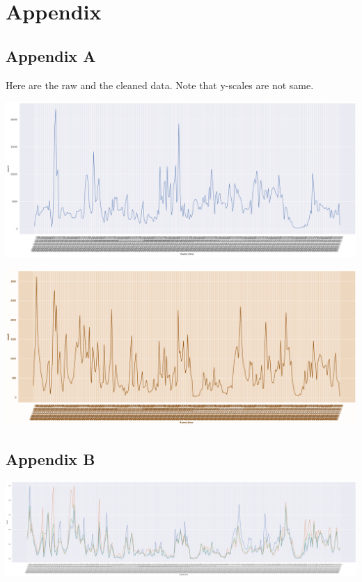 \documentclass[journal, 12pt]{IEEEtran}
\begin{document}
\printbibliography

\onecolumn 

\section{Appendix}

\subsection{Appendix A}
Here are the raw and the cleaned data. Note that y-scales are not same.

\begingroup
    \center
    \medskip
    \includegraphics[width=\columnwidth]{report/final_report/images/not_celeaned.png}
    \label{fig:raw}
    \medskip
\endgroup

\begingroup
    \center
    \medskip
    \includegraphics[width=\columnwidth]{report/final_report/images/cleaned.png}
    \label{fig:cleaned}
    \medskip
\endgroup

\subsection{Appendix B}

\begingroup
    \center
    \medskip
    \includegraphics[width=\columnwidth]{report/final_report/images/crowedness.png}
    \label{fig:pandas}
    \medskip
\endgroup
\end{document}
